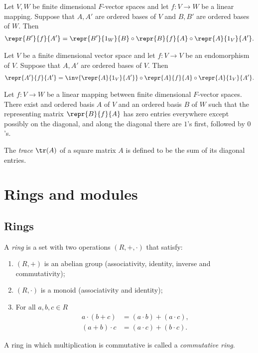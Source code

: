\documentclass{article}
\begin{document}
\begin{theorem}[Theorem 2.4.3]
	Let $V,W$ be finite dimensional $F$-vector spaces and let $f:V\to W$ be a linear mapping.
	Suppose that $A,A'$ are ordered bases of $V$ and $B,B'$ are ordered bases of $W$. Then
	\begin{align*}
		\repr{B'}{f}{A'} = \repr{B'}{1_W}{B}\circ\repr{B}{f}{A}\circ\repr{A}{1_V}{A'}.
	\end{align*}
\end{theorem}

\begin{corollary}[Corollary 2.4.4]
	Let $V$ be a finite dimensional vector space and let $f:V\to V$ be an endomorphism of $V$.
	Suppose that $A,A'$ are ordered bases of $V$. Then
	\begin{align*}
		\repr{A'}{f}{A'}=\inv{\repr{A}{1_V}{A'}}\circ\repr{A}{f}{A}\circ\repr{A}{1_V}{A'}.
	\end{align*}
\end{corollary}

\begin{theorem}[Theorem 2.4.5]
	Let $f:V\to W$ be a linear mapping between finite dimensional $F$-vector spaces. There exist
	and ordered basis $A$ of $V$ and an ordered basis $B$ of $W$ such that the representing matrix
	$\repr{B}{f}{A}$ has zero entries everywhere except possibly on the diagonal, and along the
	diagonal there are $1$'s first, followed by $0$'s.
\end{theorem}

\begin{definition}
	The \emph{trace} $\tr(A)$ of a square matrix $A$ is defined to be the sum of its diagonal entries.
\end{definition}

\section{Rings and modules}

\subsection{Rings}

\begin{definition}
	A \emph{ring} is a set with two operations $(R,+,\cdot)$ that satisfy:
	\begin{enumerate}
		\item $(R,+)$ is an abelian group (associativity, identity, inverse and commutativity);
		\item $(R,\cdot)$ is a monoid (associativity and identity);
		\item For all $a,b,c\in R$ \begin{align*}
			      a\cdot (b+c) & = (a\cdot b) + (a\cdot c), \\
			      (a+b)\cdot c & = (a\cdot c) + (b\cdot c).
		      \end{align*}
	\end{enumerate}
	A ring in which multiplication is commutative is called a \emph{commutative ring}.
\end{definition}
\end{document}
